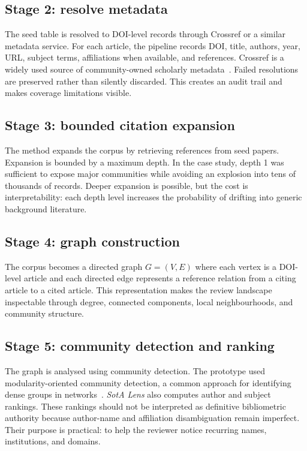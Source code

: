 \documentclass[11pt,a4paper]{article}
\newcommand{\tool}{\emph{SotA Lens}}
\begin{document}
\subsection{Stage 2: resolve metadata}

The seed table is resolved to DOI-level records through Crossref or a similar metadata service. For each article, the pipeline records DOI, title, authors, year, URL, subject terms, affiliations when available, and references. Crossref is a widely used source of community-owned scholarly metadata~\citep{hendricks2020crossref}. Failed resolutions are preserved rather than silently discarded. This creates an audit trail and makes coverage limitations visible.

\subsection{Stage 3: bounded citation expansion}

The method expands the corpus by retrieving references from seed papers. Expansion is bounded by a maximum depth. In the case study, depth 1 was sufficient to expose major communities while avoiding an explosion into tens of thousands of records. Deeper expansion is possible, but the cost is interpretability: each depth level increases the probability of drifting into generic background literature.

\subsection{Stage 4: graph construction}

The corpus becomes a directed graph $G=(V,E)$ where each vertex is a DOI-level article and each directed edge represents a reference relation from a citing article to a cited article. This representation makes the review landscape inspectable through degree, connected components, local neighbourhoods, and community structure.

\subsection{Stage 5: community detection and ranking}

The graph is analysed using community detection. The prototype used modularity-oriented community detection, a common approach for identifying dense groups in networks~\citep{newman2006modularity}. \tool{} also computes author and subject rankings. These rankings should not be interpreted as definitive bibliometric authority because author-name and affiliation disambiguation remain imperfect. Their purpose is practical: to help the reviewer notice recurring names, institutions, and domains.
\end{document}
